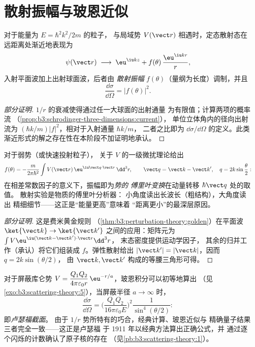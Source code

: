 \section{散射振幅与玻恩近似}

\begin{theorem}[散射态与振幅]\label{thm:b3:scattering-theory:amplitude}
对于能量为 $E = \hbar^2k^2/2m$ 的粒子，
与局域势 $V(\vect r)$ 相遇时，定态散射态在
远距离处渐近地表现为
\[
\psi(\vect r) \;\longrightarrow\;
\eu^{\iu kz} + f(\theta)\,\frac{\eu^{\iu kr}}{r} ,
\]
入射平面波加上出射球面波，后者由
\emph{散射振幅} $f(\theta)$（量纲为长度）调制，并且
\[
\frac{\dd\sigma}{\dd\Omega} = |f(\theta)|^2 .
\]
\end{theorem}

\begin{proof}[部分证明]
$1/r$ 的衰减使得通过任一大球面的出射通量
为有限值；计算两项的概率流
（\cref{prop:b3:schrodinger-three-dimensions:current}），
单位立体角内的径向出射流为
$(\hbar k/m)|f|^2$，相对于入射通量 $\hbar k/m$，
二者之比即为 $\dd\sigma/\dd\Omega$ 的定义。此类
渐近形式的解之存在性在本阶段不加证明地承认。
\end{proof}

\begin{theorem}[玻恩近似]\label{thm:b3:scattering-theory:born}
对于弱势（或快速投射粒子），
关于 $V$ 的一级微扰理论给出
\[
f(\theta) = -\frac{m}{2\pi\hbar^2}
\int V(\vect r)\,\eu^{\iu\vect q\cdot\vect r}\,\dd^3r ,
\qquad
\vect q = \vect k - \vect k' , \quad
q = 2k\sin\frac\theta2 :
\]
在相差常数因子的意义下，振幅即为\emph{势的
傅里叶变换}在动量转移 $\hbar\vect q$ 处的取值。
散射实验是物质的傅里叶分析器：
小角度读出长波长（粗结构），大角度读出
精细细节——这正是“能量更高”意味着
“距离更小”的最深层原因。
\end{theorem}

\begin{proof}[部分证明]
这是费米黄金规则
（\cref{thm:b3:perturbation-theory:golden}）在平面波
$\ket{\vect k} \to \ket{\vect k'}$ 之间的应用：矩阵元为
$\int V\eu^{\iu(\vect k - \vect k')\cdot\vect r}\dd^3r$，
末态密度提供运动学因子，
其余的归并工作（承认）将它们组装成 $f$。弹性散射给出
$|\vect k'| = |\vect k|$，因而 $q = 2k\sin(\theta/2)$，
由 $\vect k, \vect k'$ 构成的等腰三角形可得。
\end{proof}

\begin{example}[从汤川势到卢瑟福散射]\label{ex:b3:scattering-theory:rutherford}
对于屏蔽库仑势 $V = \dfrac{Q_1Q_2}{4\pi
\varepsilon_0 r}\,\eu^{-r/a}$，玻恩积分可以初等地算出
（见\cref{exo:b3:scattering-theory:5}），当屏蔽半径
$a \to \infty$ 时，
\[
\frac{\dd\sigma}{\dd\Omega} =
\Big(\frac{Q_1Q_2}{16\pi\varepsilon_0 E}\Big)^2
\frac{1}{\sin^4(\theta/2)} :
\]
即\emph{卢瑟福截面}。
由于 $1/r$ 势所特有的巧合，经典计算、玻恩近似与
精确量子结果三者完全一致——这正是卢瑟福
于 1911 年以经典方法算出正确公式，并
通过逐个闪烁的计数确认了原子核的存在
（见\cref{pb:b3:scattering-theory:1}）。
\end{example}

